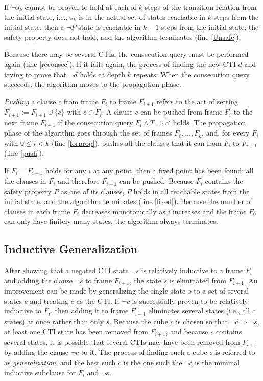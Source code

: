 \documentclass[12pt,a4paper,twoside,openright]{report}
\begin{document}
{{If $\neg s_k$ cannot be proven to hold at each of $k$ steps of
the transition relation from the initial state, i.e., $s_k$ is in the actual
set of states reachable in $k$ steps from the initial state, then a $\neg P$ state
is reachable in $k + 1$ steps from the initial state; the safety property does not
hold, and the algorithm terminates (line \ref{Unsafe}).

Because there may be several CTIs,
the consecution query must be performed again (line \ref{reconsec}). If it fails again,
the process of finding the new CTI $d$ and trying to
prove that $\neg d$ holds at depth $k$ repeats.
When the consecution query succeeds, the algorithm moves to the propagation phase.

\emph{Pushing} a clause $c$ from frame $F_i$ to frame $F_{i + 1}$ refers to the act
of setting $F_{i + 1} := F_{i + 1} \cup \{ c \}$ with $c \in F_i$.
A clause $c$ can be pushed from frame $F_i$ to the next frame $F_{i + 1}$
if the consecution query $F_i \wedge T \Rightarrow c'$ holds.
The propagation phase of the algorithm goes through the set of frames
$F_0, \ldots, F_k$, and, for every $F_i$ with $0 \leq i < k$ (line \ref{forprop}),
pushes all the clauses that it can from $F_i$ to $F_{i + 1}$ (line \ref{push}).

If $F_i = F_{i + 1}$ holds for any $i$ at any point, then a fixed point has
been found; all the clauses in $F_i$ and therefore $F_{i + 1}$
can be pushed.
Because $F_i$ contains the safety property $P$ as one of its clauses,
$P$ holds in all reachable states from the initial state,
and the algorithm terminates (line \ref{fixed}). Because the number of
clauses in each frame $F_i$ decreases monotonically as $i$ increases and the
frame $F_0$ can only have finitely many states, the algorithm always
terminates.

\subsection{Inductive Generalization}

After showing that a negated CTI state $\neg s$ is relatively inductive to a
frame $F_i$ and adding the clause $\neg s$ to frame $F_{i + 1}$, the state
$s$ is eliminated from $F_{i + 1}$. An improvement can be made by generalizing
the single state $s$ to a set of several states $c$ and treating
$c$ as the CTI. If $\neg c$ is successfully proven to be relatively inductive
to $F_i$, then adding it to frame $F_{i + 1}$ eliminates several states (i.e.,
all $c$ states) at once rather than only $s$. Because the cube $c$
is chosen so that $\neg c \Rightarrow \neg s$, at least one CTI state
has been removed from $F_{i + 1}$, and because $c$ contains several states,
it is possible that several CTIs may have been removed from $F_{i + 1}$
by adding the clause $\neg c$ to it. The process of finding such a cube $c$
is referred to as \emph{generalization}, and the best such $c$ is the
one such the $\neg c$ is the minimal inductive subclause for $F_i$ and $\neg s$.

}}
\end{document}
